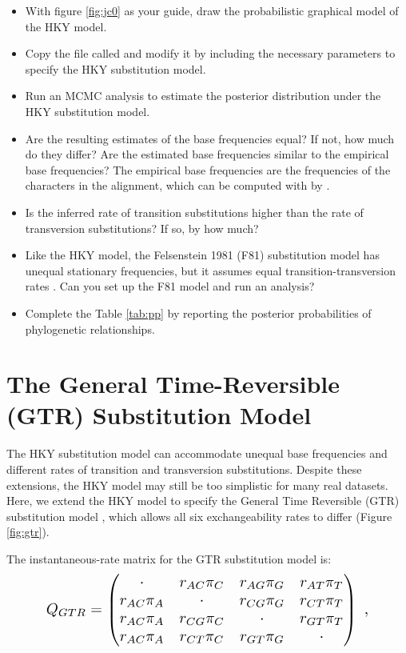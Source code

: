 \begin{itemize}
\item With figure \ref{fig:jc0} as your guide, draw the probabilistic graphical model of the HKY model.
\item Copy the file called   and modify it by including the necessary parameters to specify the HKY substitution model.
\item Run an MCMC analysis to estimate the posterior distribution under the HKY substitution model.
\item Are the resulting estimates of the base frequencies equal? 
	If not, how much do they differ? 
	Are the estimated base frequencies similar to the empirical base frequencies? 
	The empirical base frequencies are the frequencies of the characters in the alignment, which can be computed with \RevBayes by .
\item Is the inferred rate of transition substitutions higher than the rate of transversion substitutions? If so, by how much?
\item Like the HKY model, the Felsenstein 1981 (F81) substitution model has unequal stationary frequencies, but it assumes equal transition-transversion rates \citep{Felsenstein1981}.
	Can you set up the F81 model and run an analysis?
\item Complete the Table \ref{tab:pp} by reporting the posterior probabilities of phylogenetic relationships.
\end{itemize}






\newpage
\section{The General Time-Reversible (GTR) Substitution Model}

The HKY substitution model can accommodate unequal base frequencies and different rates of transition and transversion substitutions.
Despite these extensions, the HKY model may still be too simplistic for many real datasets.
Here, we extend the HKY model to specify the General Time Reversible (GTR) substitution model \citep{Tavare1986}, which allows all six exchangeability rates to differ (Figure \ref{fig:gtr}).

The instantaneous-rate matrix for the GTR substitution model is:
\begin{equation*}
\resizebox{4in}{!}{%
$Q_{GTR} = \begin{pmatrix}
{\cdot}	   & {r_{AC}\pi_C} & {r_{AG}\pi_G} & {r_{AT}\pi_T} \\
{r_{AC}\pi_A} & {\cdot}       & {r_{CG}\pi_G} & {r_{CT}\pi_T} \\
{r_{AC}\pi_A} & {r_{CG}\pi_C} & {\cdot}       & {r_{GT}\pi_T} \\
{r_{AC}\pi_A} & {r_{CT}\pi_C} & {r_{GT}\pi_G} & {\cdot}       \\
\end{pmatrix} \mbox{  ,} $}
\end{equation*}

